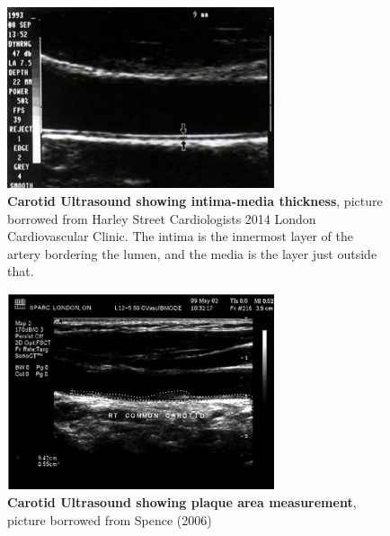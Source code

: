 \begin{figure}[h]
\begin{center}
\includegraphics[width=0.7\textwidth]{intima_media_thickness.png}
\caption{\textbf{Carotid Ultrasound showing intima-media thickness}, picture borrowed from Harley Street Cardiologists 2014 London Cardiovascular Clinic. The intima is the innermost layer of the artery bordering the lumen, and the media is the layer just outside that.}
\end{center}
\end{figure}

\begin{figure}[h]
\begin{center}
\includegraphics[width=0.7\textwidth]{plaque_area.png}
\caption{\textbf{Carotid Ultrasound showing plaque area measurement}, picture borrowed from Spence (2006)}
\end{center}
\end{figure}

